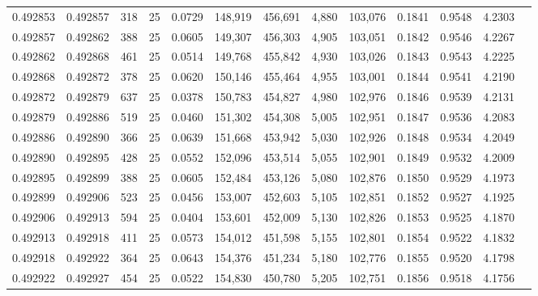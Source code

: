 \begin{tabular}{rrrrrrrrrrrrr}
0.492853 & 0.492857 &   318 &  25 &                                     0.0729 & 148,919 & 456,691 &   4,880 & 103,076 & 0.1841 & 0.9548 & 4.2303 \\
0.492857 & 0.492862 &   388 &  25 &                                     0.0605 & 149,307 & 456,303 &   4,905 & 103,051 & 0.1842 & 0.9546 & 4.2267 \\
0.492862 & 0.492868 &   461 &  25 &                                     0.0514 & 149,768 & 455,842 &   4,930 & 103,026 & 0.1843 & 0.9543 & 4.2225 \\
0.492868 & 0.492872 &   378 &  25 &                                     0.0620 & 150,146 & 455,464 &   4,955 & 103,001 & 0.1844 & 0.9541 & 4.2190 \\
0.492872 & 0.492879 &   637 &  25 &                                     0.0378 & 150,783 & 454,827 &   4,980 & 102,976 & 0.1846 & 0.9539 & 4.2131 \\
0.492879 & 0.492886 &   519 &  25 &                                     0.0460 & 151,302 & 454,308 &   5,005 & 102,951 & 0.1847 & 0.9536 & 4.2083 \\
0.492886 & 0.492890 &   366 &  25 &                                     0.0639 & 151,668 & 453,942 &   5,030 & 102,926 & 0.1848 & 0.9534 & 4.2049 \\
0.492890 & 0.492895 &   428 &  25 &                                     0.0552 & 152,096 & 453,514 &   5,055 & 102,901 & 0.1849 & 0.9532 & 4.2009 \\
0.492895 & 0.492899 &   388 &  25 &                                     0.0605 & 152,484 & 453,126 &   5,080 & 102,876 & 0.1850 & 0.9529 & 4.1973 \\
0.492899 & 0.492906 &   523 &  25 &                                     0.0456 & 153,007 & 452,603 &   5,105 & 102,851 & 0.1852 & 0.9527 & 4.1925 \\
0.492906 & 0.492913 &   594 &  25 &                                     0.0404 & 153,601 & 452,009 &   5,130 & 102,826 & 0.1853 & 0.9525 & 4.1870 \\
0.492913 & 0.492918 &   411 &  25 &                                     0.0573 & 154,012 & 451,598 &   5,155 & 102,801 & 0.1854 & 0.9522 & 4.1832 \\
0.492918 & 0.492922 &   364 &  25 &                                     0.0643 & 154,376 & 451,234 &   5,180 & 102,776 & 0.1855 & 0.9520 & 4.1798 \\
0.492922 & 0.492927 &   454 &  25 &                                     0.0522 & 154,830 & 450,780 &   5,205 & 102,751 & 0.1856 & 0.9518 & 4.1756 \\

\end{tabular}
